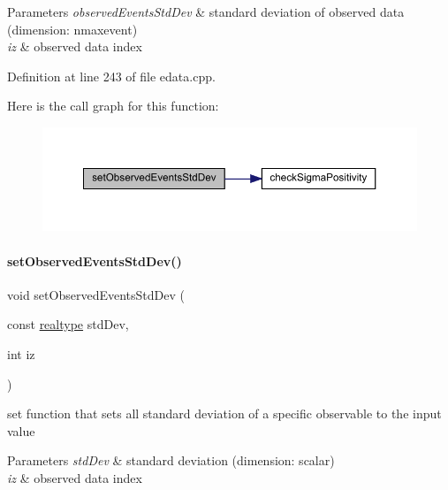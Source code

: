 \begin{DoxyParams}{Parameters}
{\em observed\+Events\+Std\+Dev} & standard deviation of observed data (dimension\+: nmaxevent) \\
\hline
{\em iz} & observed data index \\
\hline
\end{DoxyParams}


Definition at line 243 of file edata.\+cpp.

Here is the call graph for this function\+:
\nopagebreak
\begin{figure}[H]
\begin{center}
\leavevmode
\includegraphics[width=350pt]{classamici_1_1_exp_data_a9fe1de066fcba20ce994d9817442a826_cgraph}
\end{center}
\end{figure}
\mbox{\label{classamici_1_1_exp_data_a2533798d195c8ede07c783800adf1d82}} 
\paragraph{\texorpdfstring{set\+Observed\+Events\+Std\+Dev()}{setObservedEventsStdDev()}\hspace{0.1cm}{\footnotesize\ttfamily [4/4]}}
{\footnotesize\ttfamily void set\+Observed\+Events\+Std\+Dev (\begin{DoxyParamCaption}\item[{const \mbox{\hyperlink{namespaceamici_a1bdce28051d6a53868f7ccbf5f2c14a3}{realtype}}}]{std\+Dev,  }\item[{int}]{iz }\end{DoxyParamCaption})}

set function that sets all standard deviation of a specific observable to the input value


\begin{DoxyParams}{Parameters}
{\em std\+Dev} & standard deviation (dimension\+: scalar) \\
\hline
{\em iz} & observed data index \\
\hline
\end{DoxyParams}


